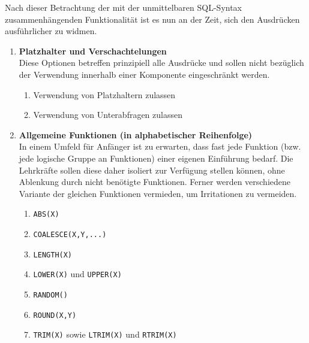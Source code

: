 Nach dieser Betrachtung der mit der unmittelbaren SQL-Syntax zusammenhängenden Funktionalität ist es nun an der Zeit, sich den Ausdrücken ausführlicher zu widmen.

\begin{enumerate}
\item \textbf{Platzhalter und Verschachtelungen} \\
  Diese Optionen betreffen prinzipiell alle Ausdrücke und sollen nicht bezüglich der Verwendung innerhalb einer Komponente eingeschränkt werden.
  \begin{enumerate}
  \item \label{feat:expr-allow-placeholder} Verwendung von Platzhaltern zulassen
  \item \label{feat:expr-allow-subquery} Verwendung von Unterabfragen zulassen
  \end{enumerate}

\item \textbf{Allgemeine Funktionen (in alphabetischer Reihenfolge)} \\
  In einem Umfeld für Anfänger ist zu erwarten, dass fast jede Funktion (bzw. jede logische Gruppe an Funktionen) einer eigenen Einführung bedarf. Die Lehrkräfte sollen diese daher isoliert zur Verfügung stellen können, ohne Ablenkung durch nicht benötigte Funktionen. Ferner werden verschiedene Variante der gleichen Funktionen vermieden, um Irritationen zu vermeiden.
  \begin{enumerate}
  \item \label{feat:fun-abs} \texttt{ABS(X)}
  \item \label{feat:fun-coalesce} \texttt{COALESCE(X,Y,...)}
  \item \label{feat:fun-length} \texttt{LENGTH(X)}
  \item \label{feat:fun-casing} \texttt{LOWER(X)} und \texttt{UPPER(X)}
  \item \label{feat:fun-random} \texttt{RANDOM()}
  \item \label{feat:fun-round} \texttt{ROUND(X,Y)}
  \item \label{feat:fun-trim} \texttt{TRIM(X)} sowie \texttt{LTRIM(X)} und \texttt{RTRIM(X)}
  \end{enumerate}


\end{enumerate}
